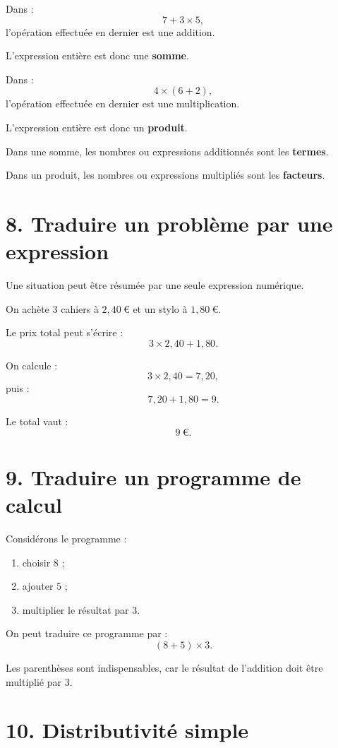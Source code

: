 Dans :
\[
7+3\times5,
\]
l'opération effectuée en dernier est une addition.

L'expression entière est donc une \textbf{somme}.

Dans :
\[
4\times(6+2),
\]
l'opération effectuée en dernier est une multiplication.

L'expression entière est donc un \textbf{produit}.

\begin{definition}
Dans une somme, les nombres ou expressions additionnés sont les \textbf{termes}.

Dans un produit, les nombres ou expressions multipliés sont les \textbf{facteurs}.
\end{definition}

\section{8. Traduire un problème par une expression}

Une situation peut être résumée par une seule expression numérique.

\begin{exemple}
On achète $3$ cahiers à $2{,}40\ \text{€}$ et un stylo à $1{,}80\ \text{€}$.

Le prix total peut s'écrire :
\[
3\times2{,}40+1{,}80.
\]

On calcule :
\[
3\times2{,}40=7{,}20,
\]
puis :
\[
7{,}20+1{,}80=9.
\]

Le total vaut :
\[
\boxed{9\ \text{€}}.
\]
\end{exemple}

\section{9. Traduire un programme de calcul}

Considérons le programme :
\begin{enumerate}
\item choisir $8$ ;
\item ajouter $5$ ;
\item multiplier le résultat par $3$.
\end{enumerate}

On peut traduire ce programme par :
\[
(8+5)\times3.
\]

Les parenthèses sont indispensables, car le résultat de l'addition doit être multiplié par $3$.

\section{10. Distributivité simple}

